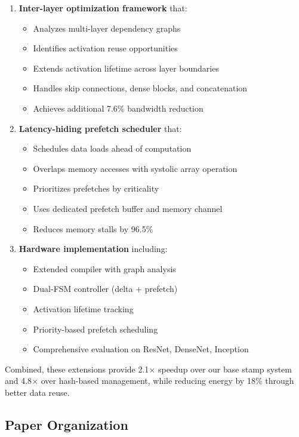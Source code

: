 \documentclass[journal]{IEEEtran}
\begin{document}
\begin{enumerate}
\item \textbf{Inter-layer optimization framework} that:
\begin{itemize}
\item Analyzes multi-layer dependency graphs
\item Identifies activation reuse opportunities
\item Extends activation lifetime across layer boundaries
\item Handles skip connections, dense blocks, and concatenation
\item Achieves additional 7.6\% bandwidth reduction
\end{itemize}

\item \textbf{Latency-hiding prefetch scheduler} that:
\begin{itemize}
\item Schedules data loads ahead of computation
\item Overlaps memory accesses with systolic array operation
\item Prioritizes prefetches by criticality
\item Uses dedicated prefetch buffer and memory channel
\item Reduces memory stalls by 96.5\%
\end{itemize}

\item \textbf{Hardware implementation} including:
\begin{itemize}
\item Extended compiler with graph analysis
\item Dual-FSM controller (delta + prefetch)
\item Activation lifetime tracking
\item Priority-based prefetch scheduling
\item Comprehensive evaluation on ResNet, DenseNet, Inception
\end{itemize}
\end{enumerate}

Combined, these extensions provide 2.1$\times$ speedup over our base stamp system and 4.8$\times$ over hash-based management, while reducing energy by 18\% through better data reuse.

\subsection{Paper Organization}
\end{document}
